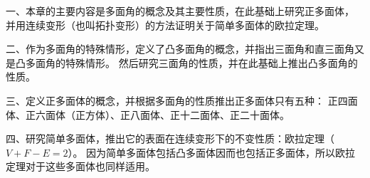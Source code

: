 \xiaojie

一、本章的主要内容是多面角的概念及其主要性质，在此基础上研究正多面体，
并用连续变形（也叫拓扑变形）的方法证明关于简单多面体的欧拉定理。


二、作为多面角的特殊情形，定义了凸多面角的概念，并指出三面角和直三面角又是凸多面角的特殊情形。
然后研究三面角的性质，并在此基础上推出凸多面角的性质。


三、定义正多面体的概念，并根据多面角的性质推出正多面体只有五种：
正四面体、正六面体（正方体）、正八面体、正十二面体、正二十面体。


四、研究简单多面体，推出它的表面在连续变形下的不变性质：欧拉定理（$V + F - E = 2$）。
因为简单多面体包括凸多面体因而也包括正多面体，所以欧拉定理对于这些多面体也同样适用。

